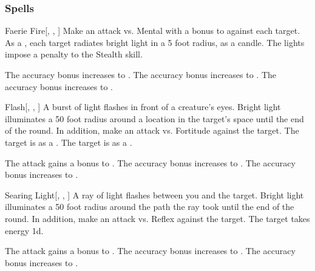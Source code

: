 \subsubsection{Spells}


\lowercase{\hypertarget{spell:Faerie Fire}{}}\label{spell:Faerie Fire}
\begin{freeability}[Rank 1]{\hypertarget{spell:Faerie Fire}{Faerie Fire}}[, , ]
Make an attack vs. Mental with a  bonus to  against each target.
\hit As a , each target radiates bright light in a 5 foot radius, as a candle.
The lights impose a  penalty to the Stealth skill.

\rankline
{} The accuracy bonus increases to .
 The accuracy bonus increases to .
 The accuracy bonus increases to .
\end{freeability}
\vspace{0.25em}



\lowercase{\hypertarget{spell:Flash}{}}\label{spell:Flash}
\begin{freeability}[Rank 1]{\hypertarget{spell:Flash}{Flash}}[, , ]
A burst of light flashes in front of a creature's eyes.
Bright light illuminates a 50 foot radius around a location in the target's space until the end of the round.
In addition, make an attack vs. Fortitude against the target.
\hit The target is  as a .
\crit The target is  as a .

\rankline
{} The attack gains a  bonus to .
 The accuracy bonus increases to .
 The accuracy bonus increases to .
\end{freeability}
\vspace{0.25em}



\lowercase{\hypertarget{spell:Searing Light}{}}\label{spell:Searing Light}
\begin{freeability}[Rank 1]{\hypertarget{spell:Searing Light}{Searing Light}}[, , ]
A ray of light flashes between you and the target.
Bright light illuminates a 50 foot radius around the path the ray took until the end of the round.
In addition, make an attack vs. Reflex against the target.
\hit The target takes energy  \plus1d.

\rankline
{} The attack gains a  bonus to .
 The accuracy bonus increases to .
 The accuracy bonus increases to .
\end{freeability}
\vspace{0.25em}



